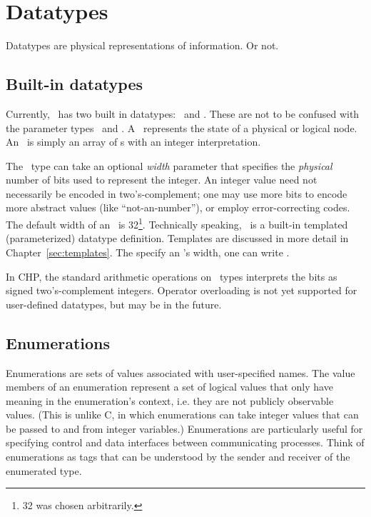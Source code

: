 
\chapter{Datatypes}
\label{sec:datatypes}

Datatypes are physical representations of information.  
Or not.  


\section{Built-in datatypes}
\label{sec:datatypes:builtin}

Currently, \artxx\ has two built in datatypes: \bool\ and \int.  
These are not to be confused with the parameter types \pbool\ and \pint.  
A \bool\ represents the state of a physical or logical node.  
An \int\ is simply an array of \bool s with an integer interpretation.  

The \int\ type can take an optional \emph{width} parameter that specifies
the \emph{physical} number of bits used to represent the integer.  
An integer value need not necessarily be encoded in two's-complement; 
one may use more bits to encode more abstract values (like ``not-an-number''), 
or employ error-correcting codes.  
The default width of an \int\ is 32\footnote{32 was chosen arbitrarily.}.
Technically speaking, \int\ is a built-in templated (parameterized) 
datatype definition.  
Templates are discussed in more detail in Chapter~\ref{sec:templates}.  
The specify an \int's width, one can write \ttt{>}.  

In CHP, the standard arithmetic operations on \int\ types interprets
the bits as signed two's-complement integers.  
Operator overloading is not yet supported for user-defined datatypes, 
but may be in the future.  

\section{Enumerations}
\label{sec:datatype:enum}

Enumerations are sets of values associated with user-specified names.  
The value members of an enumeration represent a set of 
logical values that only have meaning in the enumeration's context, 
i.e. they are not publicly observable values.  
(This is unlike C, in which enumerations can take integer values that 
can be passed to and from integer variables.)
Enumerations are particularly useful for specifying 
control and data interfaces between communicating processes.  
Think of enumerations as tags that can be understood by 
the sender and receiver of the enumerated type.  


